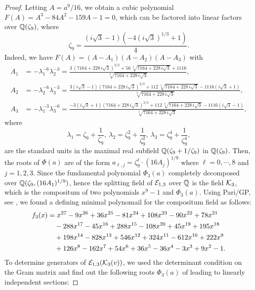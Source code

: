 \documentclass[11pt]{amsart}
\begin{document}
\begin{proof}
	Letting $A=a^9/16$, we obtain a cubic polynomial $F(A)=A^3- 84 A^2- 159 A-1=0$, which can be factored into linear factors over ${\mathbb Q}(\zeta_9)$, where
		$$\zeta_{9}=\frac{( i \sqrt{3}-1 )(-4( i \sqrt{3})^{1/3}+1)}{4}. $$
%	
	Indeed, we have  $F(A)=(A-A_1)(A-A_2)(A-A_3)$ with
\begin{align*}
	A_1& =- \lambda_1^{-6} \lambda_2^{-3}={\frac {3\, \left( 7164+228\,i\sqrt {3} \right) ^{2/3}+56\,\sqrt [3]{
				7164+228\,i\sqrt {3}}+1116}{\sqrt [3]{7164+228\,i\sqrt {3}}}},\\
	A_2& =- \lambda_2^{-6} \lambda_3^{-3}= {\frac {3 (i \sqrt {3}-1) \left( 7164+228\,i\sqrt {3} \right) ^{2/3}
			+112\,	\sqrt [3]{7164+228\,i\sqrt {3}}-1116(i\sqrt {3} +1)}{\sqrt [3]{7164+228\,i\sqrt {3}}}},\\
	A_3&= - \lambda_1^{-3} \lambda_3^{-6}={\frac {-3 (i \sqrt {3}+1) \left( 7164+228\,i\sqrt {3} \right) ^{2/3}
			+112\,	\sqrt [3]{7164+228\,i\sqrt {3}}-1116(i\sqrt {3} -1)}{\sqrt [3]{7164+228\,i\sqrt {3}}}},
\end{align*}	
	where 
	$$\lambda_1=\zeta_9+\frac{1}{\zeta_9}, \  \lambda_2=\zeta_9^2+\frac{1}{\zeta_9^2}, \ \lambda_3=\zeta_9^4+\frac{1}{\zeta_9^4},$$ 
	are the standard units in the maximal real subfield ${\mathbb Q}(\zeta_9 + 1/\zeta_9)$ in ${\mathbb Q}(\zeta_9)$.
	Then, the roots of  $\Phi(a)$ are of the form $a_{\ell,j}=\zeta_9^\ell \cdot (16 A_j)^{1/9}$ where $\ell = 0, \cdots, 8$ and $j=1, 2, 3$.
	Since the fundamental polynomial $\Phi_3(a)$ completely decomposed over ${\mathbb Q}(\zeta_9, (16 A_1)^{1/9})$, hence the splitting field of  ${\mathcal E}_{1,3}$ over ${\mathbb Q}$ is the field ${\mathcal K}_3$, which is the compositum of two polynomials $x^9-1$ and  $\Phi_3(a)$. Using Pari/GP, see \cite[GP360]{Shioda360-Codes}, we found  a defining minimal polynomail for the compositum field as follows:
	\begin{align}
	f_3(x)	& = x^{27} - 9x^{26} + 36x^{25} - 81x^{24} + 108x^{23} - 90x^{22} + 78x^{21} \notag \\
		& \quad  - 288x^{17} - 45x^{16} + 288x^{15}  - 108x^{20} + 45x^{19} + 195x^{18} \notag \\
		& \quad + 198x^{14} - 828x^{13} + 546x^{12} + 324x^{11} - 612x^{10} + 222x^{9} \notag  \\
		& \quad + 126x^{8} - 162x^{7} + 54x^{6} + 36x^{5} - 36x^{4} - 3x^{3} + 9x^{2} - 1. \label{f3}
	\end{align}
	To determine  generators of ${\mathcal E}_{1,3}({\mathcal K}_3(v))$, we used the determinant condition on the Gram matrix and find out  the following roots $\Phi_3(a)$ of leading  to linearly independent  sections:

\end{proof}
\end{document}
